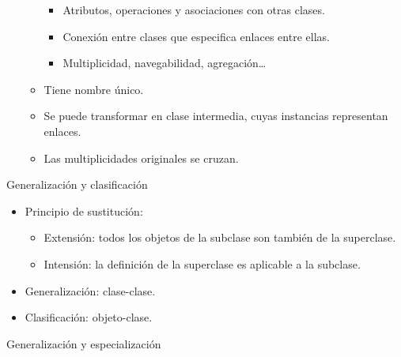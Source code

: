 \documentclass[12pt, twoside, openright]{report} %
\begin{document}
\begin{itemize}
\begin{itemize}
        \begin{itemize}
        
        \item
          Atributos, operaciones y asociaciones con otras clases.
        \item
          Conexión entre clases que especifica enlaces entre ellas.
        \item
          Multiplicidad, navegabilidad, agregación\ldots{}
        \end{itemize}
      \item
        Tiene nombre único.
		\begin{figure}[H]
			{\def\svgwidth{.8\textwidth}
  			 }
		\end{figure}
      \item
        Se puede transformar en clase intermedia, cuyas instancias
        representan enlaces.
      \item
        Las multiplicidades originales se cruzan.
		\begin{figure}[H]
			{\def\svgwidth{.8\textwidth}
  			 }
		\end{figure}
      \end{itemize}
    \end{itemize}
\pagebreak
	Generalización y clasificación

    \begin{itemize}
    
    \item
      Principio de sustitución:

      \begin{itemize}
      
      \item
        Extensión: todos los objetos de la subclase son también de la
        superclase.
      \item
        Intensión: la definición de la superclase es aplicable a la
        subclase.
      \end{itemize}
    \item
      Generalización: clase-clase.
    \item
      Clasificación: objeto-clase.
    \end{itemize}

	Generalización y especialización
\end{document}
